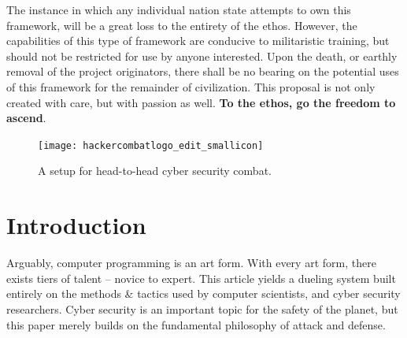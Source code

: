 \documentclass[10pt, titlepage, twocolumn]{article}
\newcommand{\drawPlayers}{

		
		\draw (0,3) circle (.5cm);
		\draw (0,2)--(0,2.5);
		\draw (0,1) -- (0,2);%
		\draw (0,1) -- (1,1);
		\draw (1,1)--(0,0);
		\draw (0,2) -- (.5,1.8) -- (1,1.8);
		
		\draw (4,3) circle (.5cm);
		\draw (4,2)--(4,2.5);
		\draw (4,1) -- (4,2);%
		\draw (4,1) -- (3,1);
		\draw (3,1)--(4,0);
		\draw (4,2) -- (3.5,1.8) -- (3,1.8);
		
		
		\draw (.75,1.70) -- (1.40,1.70);
		\draw (1.40,1.70) -- (1.35, 2.40);
		\draw (2.65,1.70) -- (3.30,1.70);
		\draw (2.65,1.70) -- (2.70, 2.40);
		
		\draw (.5,1.60) -- (3.5,1.60);
		\draw (2,1.60) -- (2,.20);
		\draw (2,.20)--(1.5,0);
		\draw (2,.20)--(2.5,0);
		\draw (1.3,0)--(1.5,0);
		\draw (2.5,0)--(2.7,0);
		
		
		\draw (-0.5,.9)--(.5,.9);
		\draw (-0.5, .9) -- (-.5,0);
		\draw (.5, .9) -- (.5,0);
		\draw (-0.5, .9) -- (-.55,1.2);
		\draw (-.55,1.2)--(-.55,2);
		
		\draw (3.5,.9)--(4.5,.9);
		\draw (4.5, .9) -- (4.5,0);
		\draw (3.5, .9) -- (3.5,0);
		\draw (4.5, .9) -- (4.55,1.2);
		\draw (4.55,1.2)--(4.55,2);

}
\newcommand\BackgroundPicSmallSig{%
\put(180,-150){%
\parbox[b][\paperheight]{\paperwidth}{%
\vfill
\centering
\texttt{[image: sig2.png]}%
\vfill
}}}
\begin{document}
The instance in which any individual nation state attempts to own this framework, will be a great loss to the entirety of the ethos. However, the capabilities of this type of framework are conducive to militaristic training, but should not be restricted for use by anyone interested. Upon the death, or earthly removal of the project originators, there shall be no bearing on the potential uses of this framework for the remainder of civilization. This proposal is not only created with care, but with passion as well. \textbf{To the ethos, go the freedom to ascend}.

\AddToShipoutPicture*{\BackgroundPicSmallSig}

\clearpage


\twocolumn

\begin{figure}[ht]
\centering
	\texttt{[image: hackercombatlogo\_edit\_smallicon]}
	\caption{A setup for head-to-head cyber security combat.}
	\label{hackercombatlogo_edit_smallicon}
\end{figure}

\section{Introduction}

Arguably, computer programming is an art form. With every art form, there exists tiers of talent -- novice to expert. This article yields a dueling system built entirely on the methods \& tactics used by computer scientists, and cyber security researchers. Cyber security is an important topic for the safety of the planet, but this paper merely builds on the fundamental philosophy of attack and defense.
\end{document}
